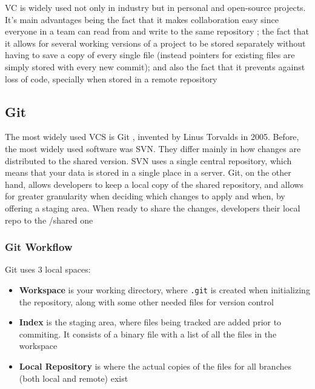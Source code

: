 

	\par{VC is widely used not only in industry but in personal and open-source
			projects. It's main advantages being the fact that it makes
			collaboration easy since everyone in a team can read from and write
			to the same repository ; the fact that it allows for several
			working versions of a project to be stored separately without having
			to save a copy of every single file (instead pointers for existing
			files are simply stored with every new commit); and also the fact
			that it prevents against loss of code, specially when stored in a
	remote repository}

	\subsection{Git}

	\par{The most widely used VCS is Git , invented by Linus Torvalds in 2005.
		Before, the most widely used software was SVN. They differ mainly in how
		changes are distributed to the shared version. SVN uses a single central
		repository, which means that your data is stored in a single place in a
		server. Git, on the other hand, allows developers to keep a local copy
		of the shared repository, and allows for greater granularity when
		deciding which changes to apply and when, by offering a staging area.
		When ready to share the changes, developers  their local repo
to the /shared one}

	\subsubsection{Git Workflow}

	\par{Git uses 3 local spaces:}

	\begin{itemize}
			\setlength\itemsep{0.5em}
			\item[]\textbf{Workspace} is your working directory, where \texttt{.git} is
			created when initializing the repository, along with some other
			needed files for version control

			\item[]\textbf{Index} is the staging area, where files being tracked are
			added prior to commiting. It consists of a binary file with a list
			of all the files in the workspace

			\item[]\textbf{Local Repository} is where the actual copies of the files
			for all branches (both local and remote) exist
	\end{itemize}

